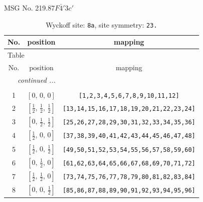 \documentclass[fleqn,8pt]{jsarticle}
\begin{document}
\setcounter{MaxMatrixCols}{32}

\renewcommand{\tablename}{Table~}
\renewcommand{\figurename}{Figure~}
\begin{center}
\LARGE
MSG No. 219.87\quad$F\bar{4}'3c'$
\end{center}
\renewcommand{\arraystretch}{1.2}
\begin{longtable}{ccc}
\caption{Wyckoff site: {\tt 8a}, site symmetry: {\tt 23.}}
 \\
 \hline \hline
No. & position & mapping \\ \hline \endfirsthead

\multicolumn{2}{l}{\tablename\ \thetable{}} \\
 \hline \hline
No. & position & mapping \\ \hline \endhead

 \hline \hline
\multicolumn{2}{r}{\footnotesize\it continued ...} \\ \endfoot

 \hline \hline
\multicolumn{2}{r}{} \\ \endlastfoot

1 & $\left[ 0,\, 0,\, 0 \right]$ & {\tt [1,2,3,4,5,6,7,8,9,10,11,12]} \\ \hline
2 & $\left[ \frac{1}{2},\, \frac{1}{2},\, \frac{1}{2} \right]$ & {\tt [13,14,15,16,17,18,19,20,21,22,23,24]} \\ \hline
3 & $\left[ 0,\, \frac{1}{2},\, \frac{1}{2} \right]$ & {\tt [25,26,27,28,29,30,31,32,33,34,35,36]} \\ \hline
4 & $\left[ \frac{1}{2},\, 0,\, 0 \right]$ & {\tt [37,38,39,40,41,42,43,44,45,46,47,48]} \\ \hline
5 & $\left[ \frac{1}{2},\, 0,\, \frac{1}{2} \right]$ & {\tt [49,50,51,52,53,54,55,56,57,58,59,60]} \\ \hline
6 & $\left[ 0,\, \frac{1}{2},\, 0 \right]$ & {\tt [61,62,63,64,65,66,67,68,69,70,71,72]} \\ \hline
7 & $\left[ \frac{1}{2},\, \frac{1}{2},\, 0 \right]$ & {\tt [73,74,75,76,77,78,79,80,81,82,83,84]} \\ \hline
8 & $\left[ 0,\, 0,\, \frac{1}{2} \right]$ & {\tt [85,86,87,88,89,90,91,92,93,94,95,96]} \\
\end{longtable}
\renewcommand{\arraystretch}{1.2}
\end{document}
